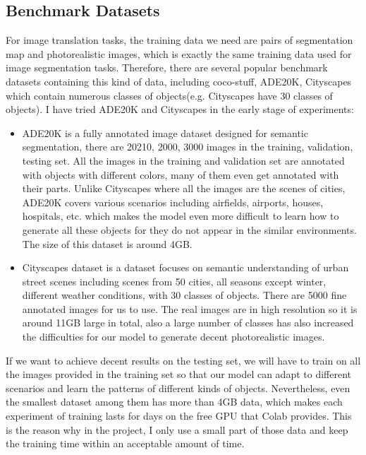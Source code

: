 \subsection{Benchmark Datasets}
For image translation tasks, the training data we need are pairs of segmentation map and 
photorealistic images, which is exactly the same training data used for image segmentation 
tasks. Therefore, there are several popular benchmark datasets containing this kind of data, 
including coco-stuff\cite{caesar2018cvpr}, ADE20K\cite{zhou2017scene}, 
Cityscapes\cite{Cordts2016Cityscapes} which contain numerous 
classes of objects(e.g. Cityscapes have 30 classes of objects).
I have tried ADE20K and Cityscapes in the early stage of experiments:
\begin{itemize}
    \item ADE20K\cite{zhou2017scene} is a fully annotated image dataset designed for semantic segmentation, 
    there are 20210, 2000, 3000 images in the training, validation, testing set. All the 
    images in the training and validation set are annotated with objects with different 
    colors, many of them even get annotated with their parts. Unlike Cityscapes where 
    all the images are the scenes of cities, ADE20K covers various scenarios including 
    airfields, airports, houses, hospitals, etc. which makes the model even more 
    difficult to learn how to generate all these objects for they do not appear in the 
    similar environments. The size of this dataset is around 4GB.
    \item Cityscapes dataset\cite{Cordts2016Cityscapes} is a dataset focuses on semantic understanding of urban street 
    scenes including scenes from 50 cities, all seasons except winter, different 
    weather conditions, with 30 classes of objects. There are 5000 fine annotated 
    images for us to use. The real images are in high resolution so it is around 11GB
    large in total, also a large number of classes has also increased the difficulties 
    for our model to generate decent photorealistic images. 
\end{itemize}
If we want to achieve decent results on the testing set, we will 
have to train on all the images provided in the training set so that our model can adapt 
to different scenarios and learn the patterns of different kinds of objects. Nevertheless, 
even the smallest dataset among them has more than 4GB data, which makes each experiment 
of training lasts for days on the free GPU that Colab provides. This is the reason why 
in the project, I only use a small part of those data and keep the training time 
within an acceptable amount of time. 
